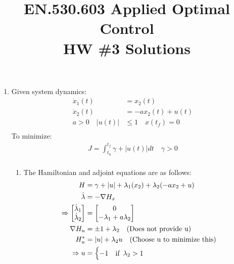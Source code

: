 
\title{EN.530.603 Applied Optimal Control \\HW \#3 Solutions}
\graphicspath{{./figures/}}

\maketitle

\begin{enumerate}

  \item Given system dynamics:
  \begin{align*}
   \dot x_1(t) &= x_2(t)\\
   \dot x_2(t) &= -a x_2(t) + u(t) \\
   a > 0 \quad |u(t)| &\le 1 \quad x(t_f) = 0\\
  \end{align*}
  To minimize:
  \begin{align*}
   J = \int_{t_0}^{t_f} \gamma + |u(t)| dt \quad \gamma > 0\\
  \end{align*}
  \begin{enumerate}
   \item The Hamiltonian and adjoint equations are as follows:
   \begin{align*}
    H &= \gamma + |u| + \lambda_1 ( x_2) + \lambda_2 (-a x_2 + u)\\
    \dot \lambda &= -\nabla H_x\\
    \Rightarrow \begin{bmatrix}
                 \dot \lambda_1\\
                 \dot \lambda_2\\
                \end{bmatrix} &= 
                \begin{bmatrix}
                 0 \\
                 -\lambda_1 + a \lambda_2\\
                \end{bmatrix}\\
    \nabla H_u &= \pm 1 + \lambda_2 \quad \text{(Does not provide u)}\\
    H^*_u &= |u| + \lambda_2 u \quad \text{(Choose u to minimize this)}\\
    \Rightarrow u &= \begin{cases}
                      -1 & \mbox{if}\enskip \lambda_2 > 1\\

\end{cases}
\end{align*}
\end{enumerate}
\end{enumerate}
